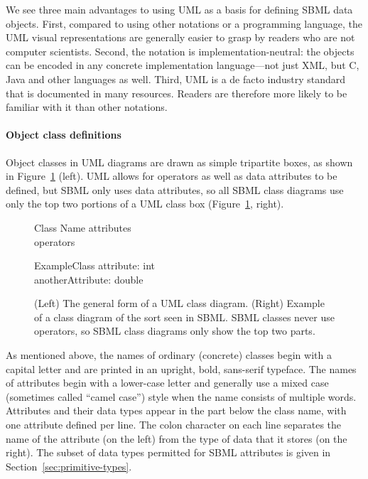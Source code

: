 We see three main advantages to using UML as a basis for defining
SBML data objects.  First, compared to using other notations or
a programming language, the UML visual representations are
generally easier to grasp by readers who are not computer
scientists.  Second, the notation is implementation-neutral: the
objects can be encoded in any concrete implementation
language---not just XML, but C, Java and other languages as well.
Third, UML is a de facto industry standard that is documented in
many resources.  Readers are therefore more likely to be familiar
with it than other notations.


\paragraph{Object class definitions}

Object classes in UML diagrams are drawn as simple tripartite
boxes, as shown in Figure~\ref{fig:simple-class-eg} (left).  UML
allows for operators as well as data attributes to be defined,
but SBML only uses data attributes, so all SBML class diagrams use
only the top two portions of a UML class box
(Figure~\ref{fig:simple-class-eg}, right).

\begin{figure}[htb]
  \centering
  \small
  \begin{classbox}{Class Name}
    attributes\\
    \hline
    operators\\
  \end{classbox}
  \quad  \quad  \quad  \quad
  \begin{classbox}{ExampleClass}
    attribute: int \\
    anotherAttribute: double\\
  \end{classbox}
  \caption{(Left) The general form of a UML class
      diagram.  (Right) Example of a class diagram of the sort
      seen in SBML.  SBML classes never use operators, so SBML
      class diagrams only show the top two parts.}
  \label{fig:simple-class-eg}
\end{figure}

As mentioned above, the names of ordinary (concrete) classes begin
with a capital letter and are printed in an upright,
bold, sans-serif typeface.  The names of attributes
begin with a lower-case letter and generally use a mixed case
(sometimes called ``camel case'') style when the name consists of
multiple words.  Attributes and their data types appear in the
part below the class name, with one attribute defined per line.
The colon character on each line separates the name of the
attribute (on the left) from the type of data that it stores (on
the right).  The subset of data types permitted for SBML
attributes is given in Section~\ref{sec:primitive-types}.

